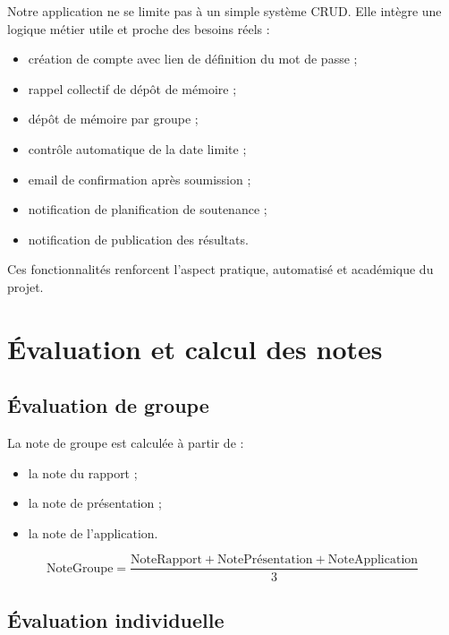 \documentclass[a4paper,12pt,oneside]{report}
\begin{document}
Notre application ne se limite pas à un simple système CRUD. Elle intègre une logique métier utile et proche des besoins réels :

\begin{itemize}
    \item création de compte avec lien de définition du mot de passe ;
    \item rappel collectif de dépôt de mémoire ;
    \item dépôt de mémoire par groupe ;
    \item contrôle automatique de la date limite ;
    \item email de confirmation après soumission ;
    \item notification de planification de soutenance ;
    \item notification de publication des résultats.
\end{itemize}

Ces fonctionnalités renforcent l'aspect pratique, automatisé et académique du projet.

\chapter{Évaluation et calcul des notes}

\section{Évaluation de groupe}

La note de groupe est calculée à partir de :
\begin{itemize}
    \item la note du rapport ;
    \item la note de présentation ;
    \item la note de l'application.
\end{itemize}

\begin{equation}
\text{NoteGroupe} = \frac{\text{NoteRapport} + \text{NotePrésentation} + \text{NoteApplication}}{3}
\end{equation}

\section{Évaluation individuelle}
\end{document}
